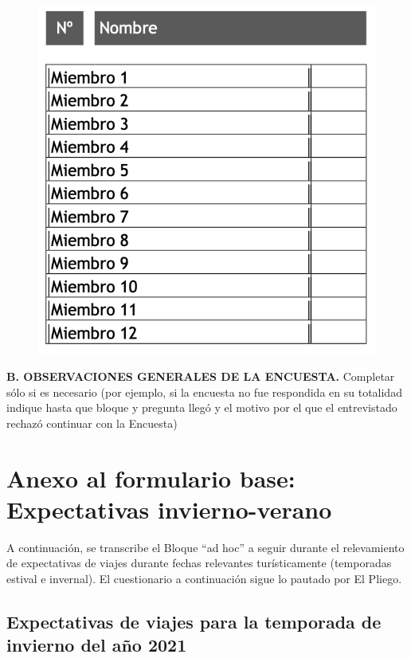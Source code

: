 \documentclass[
  openany]{book}
\begin{document}
\begin{figure}

{\centering \includegraphics[width=1\linewidth]{imagenes/figura6-303} 

}

\end{figure}

\textbf{B. OBSERVACIONES GENERALES DE LA ENCUESTA.}
Completar sólo si es necesario (por ejemplo, si la encuesta no fue respondida en su totalidad indique hasta que bloque y pregunta llegó y el motivo por el que el entrevistado rechazó continuar con la Encuesta)

\hypertarget{anexo-al-formulario-base-expectativas-invierno-verano}{%
\section{Anexo al formulario base: Expectativas invierno-verano}\label{anexo-al-formulario-base-expectativas-invierno-verano}}

A continuación, se transcribe el Bloque ``ad hoc'' a seguir durante el relevamiento de expectativas de viajes durante fechas relevantes turísticamente (temporadas estival e invernal). El cuestionario a continuación sigue lo pautado por El Pliego.

\hypertarget{expectativas-de-viajes-para-la-temporada-de-invierno-del-auxf1o-2021}{%
\subsection{Expectativas de viajes para la temporada de invierno del año 2021}\label{expectativas-de-viajes-para-la-temporada-de-invierno-del-auxf1o-2021}}
\end{document}
